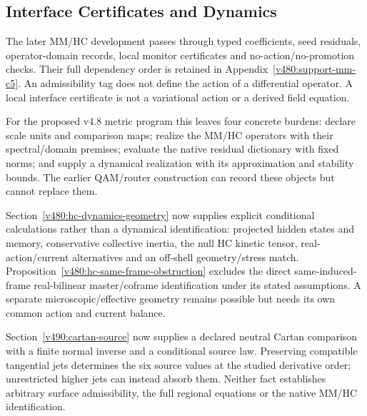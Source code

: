 \subsection{Interface Certificates and Dynamics}

The later MM/HC development passes through typed coefficients,
seed residuals, operator-domain records, local monitor certificates
and no-action/no-promotion checks. Their full dependency order is
retained in Appendix~\ref{v480:support-mm-c5}. An admissibility tag
does not define the action of a differential operator. A local
interface certificate is not a variational action or a derived
field equation.

For the proposed v4.8 metric program this leaves four concrete burdens:
declare scale units and comparison maps; realize the MM/HC operators
with their spectral/domain premises; evaluate the native residual
dictionary with fixed norms; and supply a dynamical realization with
its approximation and stability bounds. The earlier QAM/router
construction can record these objects but cannot replace them.

Section~\ref{v480:hc-dynamics-geometry} now supplies explicit conditional
calculations rather than a dynamical identification: projected hidden
states and memory, conservative collective inertia, the null HC kinetic
tensor, real-action/current alternatives and an off-shell geometry/stress
match. Proposition~\ref{v480:hc-same-frame-obstruction} excludes the direct
same-induced-frame real-bilinear master/coframe identification under its
stated assumptions. A separate microscopic/effective geometry remains
possible but needs its own common action and current balance.

Section~\ref{v490:cartan-source} now supplies a declared neutral Cartan
comparison with a finite normal inverse and a conditional source law.
Preserving compatible tangential jets determines the six source values
at the studied derivative order; unrestricted higher jets can instead
absorb them. Neither fact establishes arbitrary surface admissibility,
the full regional equations or the native MM/HC identification.
